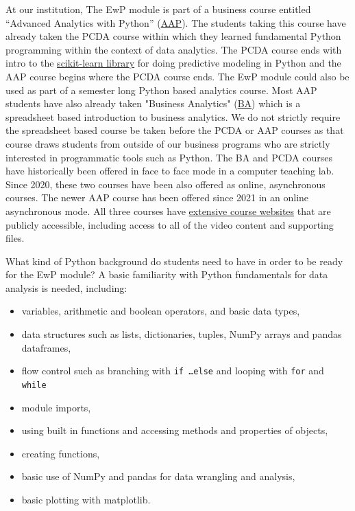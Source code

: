 \documentclass[ited,blindrev]{informs3}              %
\begin{document}
At our institution, The EwP module is part of a business course entitled ``Advanced Analytics with Python'' (\href{http://www.sba.oakland.edu/faculty/isken/courses/mis6900}{AAP}). The students taking this course have already taken the PCDA course within which they learned fundamental Python programming within the context of data analytics. The PCDA course ends with intro to the \href{https://scikit-learn.org/stable/index.html}{scikit-learn library} for doing predictive modeling in Python and the AAP course begins where the PCDA course ends. The EwP module could also be used as part of a semester long Python based analytics course. Most AAP students have also already taken "Business Analytics" (\href{http://www.sba.oakland.edu/faculty/isken/courses/mis5460}{BA}) which is a spreadsheet based introduction to business analytics. We do not strictly require the spreadsheet based course be taken before the PCDA or AAP courses as that course draws students from outside of our business programs who are strictly interested in programmatic tools such as Python. The BA and PCDA courses have historically been offered in face to face mode in a computer teaching lab. Since 2020, these two courses have been also offered as online, asynchronous courses. The newer AAP course has been offered since 2021 in an online asynchronous mode. All three courses have \href{http://www.sba.oakland.edu/Faculty/isken/teaching.html}{extensive course websites} that are publicly accessible, including access to all of the video content and supporting files. 

What kind of Python background do students need to have in order to be ready for the EwP module? A basic familiarity with Python fundamentals for data analysis is needed, including:

\begin{itemize}
	\item variables, arithmetic and boolean operators, and basic data types,
	\item data structures such as lists, dictionaries, tuples, NumPy arrays and pandas dataframes,
	\item flow control such as branching with \texttt{if \ldots else} and looping with \texttt{for} and \texttt{while}
	\item module imports,
	\item using built in functions and accessing methods and properties of objects,
	\item creating functions,
	\item basic use of NumPy and pandas for data wrangling and analysis,
	\item basic plotting with matplotlib.
\end{itemize}
\end{document}
